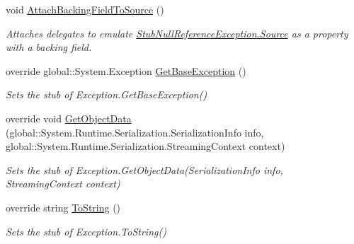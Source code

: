 \begin{DoxyCompactItemize}
void \hyperlink{class_system_1_1_fakes_1_1_stub_null_reference_exception_a95d3e0238ef5afd832f5a5c90a96e365}{Attach\-Backing\-Field\-To\-Source} ()
\begin{DoxyCompactList}\small\item\em Attaches delegates to emulate \hyperlink{class_system_1_1_fakes_1_1_stub_null_reference_exception_a11c37624b140b9a0481a7723bbd7ced8}{Stub\-Null\-Reference\-Exception.\-Source} as a property with a backing field.\end{DoxyCompactList}\item 
override global\-::\-System.\-Exception \hyperlink{class_system_1_1_fakes_1_1_stub_null_reference_exception_a4ae8e3d2b8d5310bf14e3902b35dbf81}{Get\-Base\-Exception} ()
\begin{DoxyCompactList}\small\item\em Sets the stub of Exception.\-Get\-Base\-Exception()\end{DoxyCompactList}\item 
override void \hyperlink{class_system_1_1_fakes_1_1_stub_null_reference_exception_aa772fb712642813db04efa7829dc96a7}{Get\-Object\-Data} (global\-::\-System.\-Runtime.\-Serialization.\-Serialization\-Info info, global\-::\-System.\-Runtime.\-Serialization.\-Streaming\-Context context)
\begin{DoxyCompactList}\small\item\em Sets the stub of Exception.\-Get\-Object\-Data(\-Serialization\-Info info, Streaming\-Context context)\end{DoxyCompactList}\item 
override string \hyperlink{class_system_1_1_fakes_1_1_stub_null_reference_exception_a0c683d38e5c4461dc0fbb4d025603d32}{To\-String} ()
\begin{DoxyCompactList}\small\item\em Sets the stub of Exception.\-To\-String()\end{DoxyCompactList}\end{DoxyCompactItemize}
